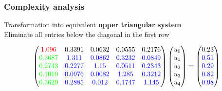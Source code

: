 \documentclass{beamer}
\begin{document}
\begin{frame}[fragile]
  \frametitle{Complexity analysis}
  Transformation into equivalent \textbf{upper triangular system}\\[1ex]
Eliminate all entries below the diagonal in the first row
\begin{algorithmic}[1]
\EndFor
{} 
\EndFor
\end{algorithmic}

$$
      \begin{pmatrix}
\textcolor{red}{1.096} & \textcolor{black}{0.3391} & \textcolor{black}{0.0632} & \textcolor{black}{0.0555} & \textcolor{black}{0.2176}\\
\textcolor{green}{0.3687} & \textcolor{blue}{1.311} & \textcolor{blue}{0.0862} & \textcolor{blue}{0.3232} & \textcolor{blue}{0.0849}\\
\textcolor{green}{0.2743} & \textcolor{blue}{0.2277} & \textcolor{blue}{1.15} & \textcolor{blue}{0.0511} & \textcolor{blue}{0.2343}\\
\textcolor{green}{0.1019} & \textcolor{blue}{0.0976} & \textcolor{blue}{0.0082} & \textcolor{blue}{1.285} & \textcolor{blue}{0.3212}\\
\textcolor{green}{0.3629} & \textcolor{blue}{0.2885} & \textcolor{blue}{0.012} & \textcolor{blue}{0.1747} & \textcolor{blue}{1.145}
\end{pmatrix}
\begin{pmatrix}
u_0 \\ u_1 \\ u_2 \\ u_3 \\ u_4
\end{pmatrix}
=
  \begin{pmatrix}
\textcolor{black}{0.23}\\
\textcolor{blue}{0.51}\\
\textcolor{blue}{0.29}\\
\textcolor{blue}{0.82}\\
\textcolor{blue}{0.98}
\end{pmatrix}
$$
\end{frame}
\end{document}

